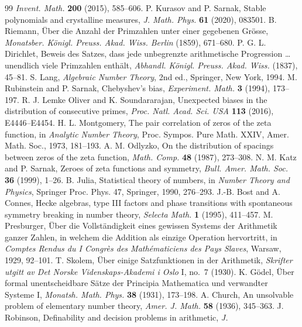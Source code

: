 \documentclass[11pt]{article}
\theoremstyle{remark}
\begin{document}
\begin{thebibliography}{99}
\emph{Invent. Math.} \textbf{200} (2015), 585--606.
 P. Kurasov and P. Sarnak, Stable polynomials and crystalline measures,
\emph{J. Math. Phys.} \textbf{61} (2020), 083501.
 B. Riemann, \"Uber die Anzahl der Primzahlen unter einer gegebenen Gr\"osse,
\emph{Monatsber. K\"onigl. Preuss. Akad. Wiss. Berlin} (1859), 671--680.
 P. G. L. Dirichlet, Beweis des Satzes, dass jede unbegrenzte arithmetische
Progression \ldots unendlich viele Primzahlen enth\"alt, \emph{Abhandl. K\"onigl. Preuss. Akad.
Wiss.} (1837), 45--81.
 S. Lang, \emph{Algebraic Number Theory}, 2nd ed., Springer, New York, 1994.
 M. Rubinstein and P. Sarnak, Chebyshev's bias, \emph{Experiment. Math.}
\textbf{3} (1994), 173--197.
 R. J. Lemke Oliver and K. Soundararajan, Unexpected biases in the distribution of
consecutive primes, \emph{Proc. Natl. Acad. Sci. USA} \textbf{113} (2016), E4446--E4454.
 H. L. Montgomery, The pair correlation of zeros of the zeta function, in
\emph{Analytic Number Theory}, Proc. Sympos. Pure Math. XXIV, Amer. Math. Soc., 1973, 181--193.
 A. M. Odlyzko, On the distribution of spacings between zeros of the zeta function,
\emph{Math. Comp.} \textbf{48} (1987), 273--308.
 N. M. Katz and P. Sarnak, Zeroes of zeta functions and symmetry, \emph{Bull.
Amer. Math. Soc.} \textbf{36} (1999), 1--26.
 B. Julia, Statistical theory of numbers, in \emph{Number Theory and Physics},
Springer Proc. Phys. 47, Springer, 1990, 276--293.
 J.-B. Bost and A. Connes, Hecke algebras, type III factors and phase
transitions with spontaneous symmetry breaking in number theory, \emph{Selecta Math.} \textbf{1}
(1995), 411--457.
 M. Presburger, \"Uber die Vollst\"andigkeit eines gewissen Systems der
Arithmetik ganzer Zahlen, in welchem die Addition als einzige Operation hervortritt, in
\emph{Comptes Rendus du I Congr\`es des Math\'ematiciens des Pays Slaves}, Warsaw, 1929, 92--101.
 T. Skolem, \"Uber einige Satzfunktionen in der Arithmetik, \emph{Skrifter utgitt
av Det Norske Videnskaps-Akademi i Oslo} I, no.~7 (1930).
 K. G\"odel, \"Uber formal unentscheidbare S\"atze der Principia Mathematica und
verwandter Systeme I, \emph{Monatsh. Math. Phys.} \textbf{38} (1931), 173--198.
 A. Church, An unsolvable problem of elementary number theory, \emph{Amer. J.
Math.} \textbf{58} (1936), 345--363.
 J. Robinson, Definability and decision problems in arithmetic, \emph{J.
}
\end{thebibliography}
\end{document}
